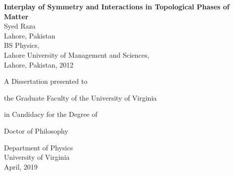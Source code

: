 %
%
\begin{titlepage}
\null\vfill
\begin{center}
{\bf{\Huge  Interplay of Symmetry and Interactions in Topological Phases of Matter}}\\[2em]
{\huge Syed Raza}\\

\large Lahore, Pakistan\\[1em]
\large BS Physics, \\ Lahore University of Management and Sciences,\\ Lahore, Pakistan, 2012\\

\par\vskip2cm

   \large
A Dissertation presented to \par
the Graduate Faculty
of the University of Virginia\par in Candidacy for the Degree of\par
Doctor of Philosophy\par  \vskip1cm
   Department of Physics\\
   University of Virginia\\
April, 2019
   \end{center}\vfill



\end{titlepage}
